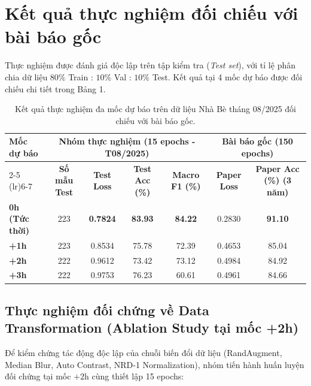 \documentclass[12pt,a4paper]{article}
\begin{document}
\vspace{0.4cm}
\section{Kết quả thực nghiệm đối chiếu với bài báo gốc}

Thực nghiệm được đánh giá độc lập trên tập kiểm tra (\textit{Test set}), với tỉ lệ phân chia dữ liệu $80\%$ Train : $10\%$ Val : $10\%$ Test. Kết quả tại 4 mốc dự báo được đối chiếu chi tiết trong Bảng 1.

\begin{table}[H]
\centering
\caption{Kết quả thực nghiệm đa mốc dự báo trên dữ liệu Nhà Bè tháng 08/2025 đối chiếu với bài báo gốc.}
\vspace{0.2cm}
\begin{tabular}{lcccccc}
\toprule
\multirow{2}{*}{\textbf{Mốc dự báo}} & \multicolumn{4}{c}{\textbf{Nhóm thực nghiệm (15 epochs - T08/2025)}} & \multicolumn{2}{c}{\textbf{Bài báo gốc (150 epochs)}} \\
\cmidrule(lr){2-5} \cmidrule(lr){6-7}
& \textbf{Số mẫu Test} & \textbf{Test Loss} & \textbf{Test Acc (\%)} & \textbf{Macro F1 (\%)} & \textbf{Paper Loss} & \textbf{Paper Acc (\%) (3 năm)} \\
\midrule
\textbf{0h (Tức thời)} & 223 & \textbf{0.7824} & \textbf{83.93} & \textbf{84.22} & 0.2830 & \textbf{91.10} \\
\textbf{+1h}           & 223 & 0.8534          & 75.78          & 72.39          & 0.4653 & 85.04 \\
\textbf{+2h}           & 222 & 0.9612          & 73.42          & 73.12          & 0.4984 & 84.92 \\
\textbf{+3h}           & 222 & 0.9753          & 76.23          & 60.61          & 0.4961 & 84.66 \\
\bottomrule
\end{tabular}
\end{table}

\subsection{Thực nghiệm đối chứng về Data Transformation (Ablation Study tại mốc +2h)}
Để kiểm chứng tác động độc lập của chuỗi biến đổi dữ liệu (RandAugment, Median Blur, Auto Contrast, NRD-1 Normalization), nhóm tiến hành huấn luyện đối chứng tại mốc $+2\text{h}$ cùng thiết lập 15 epochs:
\end{document}
